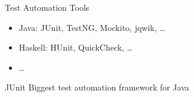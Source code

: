 \begin{frame}{\insertsubsection}
\begin{fancycolumns}[animation=none, b]
		\begin{definition}{Test Automation Tools}
			\begin{itemize}
				\item Java: JUnit, TestNG, Mockito, jqwik, \dots
				\item Haskell: HUnit, QuickCheck, \dots
				\item \dots
			\end{itemize}
		\end{definition} \pause
		\begin{note}{JUnit} %
			Biggest test automation framework for Java		
		\end{note}
	\end{fancycolumns}
\end{frame}

